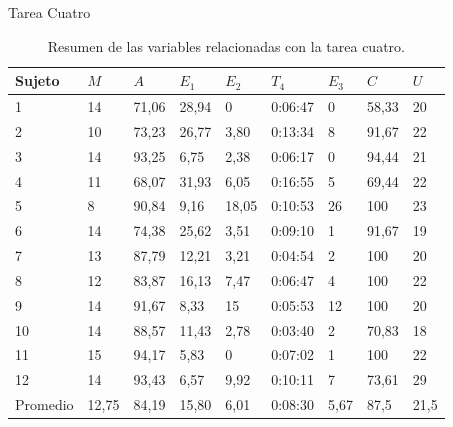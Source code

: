 \begin{frame}{Tarea Cuatro}

\begin{table}[H]
\centering
\footnotesize
\begin{tabular}{|p{1.2cm}|p{0.6cm}|p{0.7cm}|p{0.7cm}|p{0.7cm}|p{0.9cm}|p{0.6cm}|p{0.7cm}|p{0.6cm}|}
\hline
Sujeto & $M$ & $A$ & $E_1$ & $E_2$  & $T_4$      & $E_3$ & $C$ & $U$ \\
 \hline 
1  & 14 &  71,06 & 28,94 &  0     &  0:06:47   &  0  &  58,33 &  20  \\ 
2  & 10 &  73,23 & 26,77 &  3,80  &  0:13:34   &  8  &  91,67 &  22 \\
3  & 14 &  93,25 & 6,75  &  2,38  &  0:06:17   &  0  &  94,44 &  21 \\
4  & 11 &  68,07 & 31,93 &  6,05  &  0:16:55   &  5  &  69,44 &  22 \\
5  & 8  &  90,84 & 9,16  &  18,05 &  0:10:53   &  26 &  100   &  23 \\
6  & 14 &  74,38 & 25,62 &  3,51  &  0:09:10   &  1  &  91,67 &  19  \\
7  & 13 &  87,79 & 12,21 &  3,21  &  0:04:54   &  2  &  100   &  20  \\
8  & 12 &  83,87 & 16,13 &  7,47  &  0:06:47   &  4  &  100   &  22  \\
9  & 14 &  91,67 & 8,33  &  15    &  0:05:53   &  12 &  100   &  20  \\
10 & 14 &  88,57 & 11,43 &  2,78  &  0:03:40   &  2  &  70,83 &  18  \\
11 & 15 &  94,17 & 5,83  &  0     &  0:07:02   &  1  &  100   &  22  \\
12 & 14 &  93,43 & 6,57  &  9,92  &  0:10:11   &  7  &  73,61 &  29  \\
\hline
  Promedio &  12,75 & 84,19   & 15,80 & 6,01 & 0:08:30 & 5,67 & 87,5  & 21,5   \\
\hline
\end{tabular}
\caption{Resumen de las variables relacionadas con la tarea cuatro.}
\label{sec:tabla-tarea4}
\end{table}
\end{frame}

